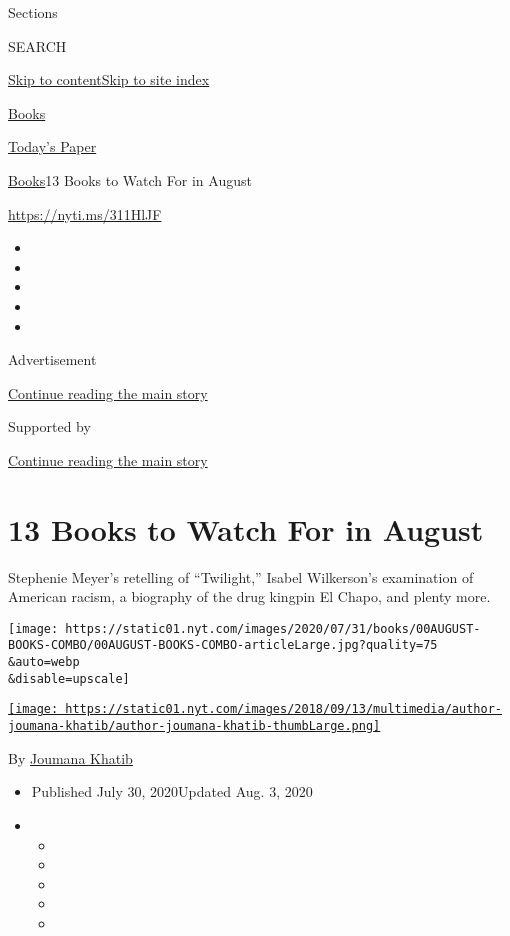 Sections

SEARCH

\protect\hyperlink{site-content}{Skip to
content}\protect\hyperlink{site-index}{Skip to site index}

\href{https://www.nytimes.com/section/books}{Books}

\href{https://myaccount.nytimes.com/auth/login?response_type=cookie\&client_id=vi}{}

\href{https://www.nytimes.com/section/todayspaper}{Today's Paper}

\href{/section/books}{Books}\textbar{}13 Books to Watch For in August

\url{https://nyti.ms/311HlJF}

\begin{itemize}
\item
\item
\item
\item
\item
\end{itemize}

Advertisement

\protect\hyperlink{after-top}{Continue reading the main story}

Supported by

\protect\hyperlink{after-sponsor}{Continue reading the main story}

\hypertarget{13-books-to-watch-for-in-august}{%
\section{13 Books to Watch For in
August}\label{13-books-to-watch-for-in-august}}

Stephenie Meyer's retelling of ``Twilight,'' Isabel Wilkerson's
examination of American racism, a biography of the drug kingpin El
Chapo, and plenty more.

\texttt{[image: https://static01.nyt.com/images/2020/07/31/books/00AUGUST-BOOKS-COMBO/00AUGUST-BOOKS-COMBO-articleLarge.jpg?quality=75\\\&auto=webp\\\&disable=upscale]}

\href{https://nytimes.com/by/joumana-khatib}{\texttt{[image: https://static01.nyt.com/images/2018/09/13/multimedia/author-joumana-khatib/author-joumana-khatib-thumbLarge.png]}}

By \href{https://nytimes.com/by/joumana-khatib}{Joumana Khatib}

\begin{itemize}
\item
  Published July 30, 2020Updated Aug. 3, 2020
\item
  \begin{itemize}
  \item
  \item
  \item
  \item
  \item
  \end{itemize}
\end{itemize}

